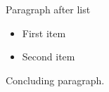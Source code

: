 \documentclass[14pt,t]{beamer-accessibility}
\begin{document}
\begin{frame}{Paragraph after list}
\begin{itemize}
\item First item
\item Second item
\end{itemize}

Concluding paragraph.
\end{frame}
\end{document}
